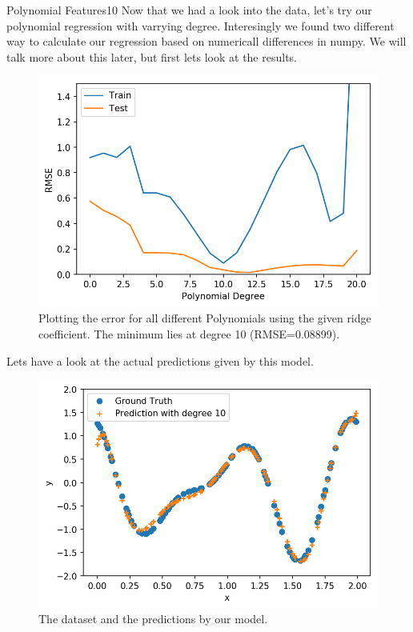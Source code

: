 \begin{questions}
\begin{question}{Polynomial Features}{10}
Now that we had a look into the data, let's try our polynomial regression with varrying degree. Interesingly we found two different way to calculate our regression based on numericall differences in numpy. We will talk more about this later, but first lets look at the results.
\begin{figure}[H]
	\includegraphics[width=0.6\linewidth]{pictures/polynomial_regression_ridge.png}
	\centering
	\caption{Plotting the error for all different Polynomials using the given ridge coefficient. The minimum lies at degree 10 (RMSE=0.08899).}
	\label{fig:ridge}
\end{figure}
Lets have a look at the actual predictions given by this model.
\begin{figure}[H]
	\includegraphics[width=0.6\linewidth]{pictures/groundTruth_polynomial_10.png}
	\centering
	\caption{The dataset and the predictions by our model.}
	\label{fig:pred_10}
\end{figure}


\end{question}
\end{questions}
